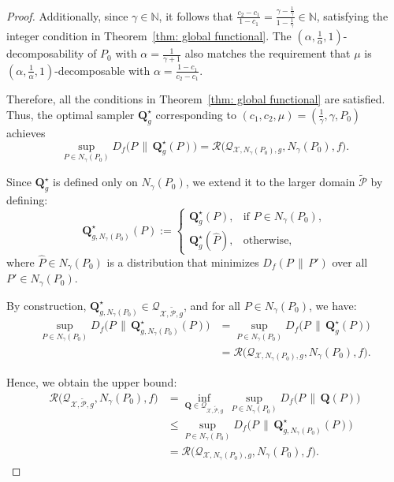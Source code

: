 \documentclass[accepted]{article}
\theoremstyle{plain} %
\theoremstyle{definition}
\theoremstyle{remark}
\newcommand{\bQ}{\mathbf{Q}}
\begin{document}
\begin{proof}
Additionally, since \(\gamma \in \mathbb{N}\), it follows that 
\(\tfrac{c_2 - c_1}{1 - c_1} = \tfrac{\gamma - \frac{1}{\gamma}}{1 - \frac{1}{\gamma}} \in \mathbb{N}\), 
satisfying the integer condition in Theorem~\ref{thm: global functional}. The \((\alpha,\frac{1}{\alpha},1)\)-decomposability 
of \(P_0\) with \(\alpha = \tfrac{1}{\gamma + 1}\) also matches the requirement that $\mu$ is $(\alpha,\frac{1}{\alpha},1)$-decomposable with  
\(\alpha = \tfrac{1 - c_1}{c_2 - c_1}\).

Therefore, all the conditions in Theorem~\ref{thm: global functional} are satisfied. Thus, the optimal 
sampler \(\bQ^\star_g\) corresponding to 
\((c_1, c_2, \mu) = \left(\tfrac{1}{\gamma}, \gamma, P_0\right)\) achieves
\[
\sup_{P \in N_\gamma(P_0)} D_f\big(P \, \| \, \bQ^\star_g(P)\big)
= \mathcal{R}\big(\mathcal{Q}_{\mathcal{X}, N_\gamma(P_0), g}, N_\gamma(P_0), f\big).
\]

Since \(\bQ^\star_g\) is defined only on \(N_\gamma(P_0)\), we extend it to the larger domain 
\(\tilde{\mathcal{P}}\) by defining:
\[
\bQ^\star_{g, N_\gamma(P_0)}(P) := 
\begin{cases}
\bQ^\star_g(P), & \text{if } P \in N_\gamma(P_0), \\[6pt]
\bQ^\star_g(\hat{P}), & \text{otherwise},
\end{cases}
\]
where \( \hat{P} \in N_\gamma(P_0) \) is a distribution that minimizes \(  D_f(P \,\|\, P') \) over all $P' \in N_\gamma(P_0)$.

By construction, \(\bQ^\star_{g, N_\gamma(P_0)} \in \mathcal{Q}_{\mathcal{X}, \tilde{\mathcal{P}}, g}\), 
and for all \(P \in N_\gamma(P_0)\), we have:
\begin{align*}
\sup_{P \in N_\gamma(P_0)} D_f\big(P \, \| \, \bQ^\star_{g, N_\gamma(P_0)}(P)\big) 
&= \sup_{P \in N_\gamma(P_0)} D_f\big(P \, \| \, \bQ^\star_g(P)\big) \\
&= \mathcal{R}\big(\mathcal{Q}_{\mathcal{X}, N_\gamma(P_0), g}, N_\gamma(P_0), f\big).
\end{align*}

Hence, we obtain the upper bound:
\begin{align} \label{eqn: upper bound local functional}
\mathcal{R}\big(\mathcal{Q}_{\mathcal{X}, \tilde{\mathcal{P}}, g}, N_\gamma(P_0), f\big)
&= \inf_{\bQ \in \mathcal{Q}_{\mathcal{X}, \tilde{\mathcal{P}}, g}} \,
\sup_{P \in N_\gamma(P_0)} D_f\big(P \, \| \, \bQ(P)\big) \nonumber \\ 
&\leq \sup_{P \in N_\gamma(P_0)} D_f\big(P \, \| \, \bQ^\star_{g, N_\gamma(P_0)}(P)\big)  \nonumber \\ & = \mathcal{R}\big(\mathcal{Q}_{\mathcal{X}, N_\gamma(P_0), g}, N_\gamma(P_0), f\big).
\end{align}


\end{proof}
\end{document}
